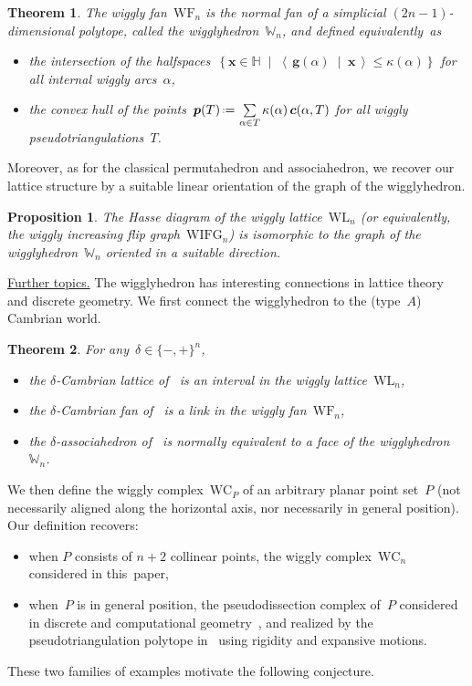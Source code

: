 \documentclass{amsart}
\newtheorem*{theorem*}{Theorem}%
\newtheorem*{proposition*}{Proposition}%
\theoremstyle{definition}
\newcommand{\HH}{\mathbb{H}} %
\renewcommand{\b}[1]{{\boldsymbol{#1}}} %
\newcommand{\set}[2]{\left\{ #1 \;\middle|\; #2 \right\}} %
\newcommand{\dotprod}[2]{\left\langle \, #1 \; \middle| \; #2 \, \right\rangle} %
\newcommand{\eqdef}{\mbox{\,\raisebox{0.2ex}{\scriptsize\ensuremath{\mathrm:}}\ensuremath{=}\,}} %
\newcommand{\darkblue}{\color{darkblue}} %
\newcommand{\defn}[1]{\textsl{\darkblue #1}} %
\newcommand{\para}[1]{\smallskip\noindent\uline{#1.}} %
\newcommand{\polytope}[1]{\mathds{#1}} %
\newcommand{\wigglyComplex}{\mathrm{WC}} %
\newcommand{\wigglyIncreasingFlipGraph}{\mathrm{WIFG}} %
\newcommand{\wigglyLattice}{\mathrm{WL}} %
\newcommand{\wigglyFan}{\mathrm{WF}} %
\newcommand{\wigglyhedron}{\polytope{W}} %
\begin{document}
\begin{theorem*}
The wiggly fan~$\wigglyFan_n$ is the normal fan of a simplicial $(2n-1)$-dimensional polytope, called the \defn{wigglyhedron}~$\wigglyhedron_n$, and defined equivalently~as
\begin{itemize}
\item the intersection of the halfspaces~$\set{\b{x} \in \HH}{\dotprod{\b{g}(\alpha)}{\b{x}} \le \kappa(\alpha)}$ for all internal wiggly arcs~$\alpha$,
\item the convex hull of the points~$\b{p}(T) \eqdef \sum\limits_{\alpha \in T} \kappa(\alpha) \, \b{c}(\alpha, T)$ for all wiggly pseudotriangulations~$T$.
\end{itemize}
\end{theorem*}

Moreover, as for the classical permutahedron and associahedron, we recover our lattice structure by a suitable linear orientation of the graph of the wigglyhedron.

\begin{proposition*}
The Hasse diagram of the wiggly lattice~$\wigglyLattice_n$ (or equivalently, the wiggly increasing flip graph~$\wigglyIncreasingFlipGraph_n$) is isomorphic to the graph of the wigglyhedron~$\wigglyhedron_n$ oriented in a suitable direction.
\end{proposition*}

\para{Further topics}
The wigglyhedron has interesting connections in lattice theory and discrete geometry.
We first connect the wigglyhedron to the (type~$A$) Cambrian world.

\begin{theorem*}
For any~$\delta \in \{-,+\}^n$,
\begin{itemize}
\item the $\delta$-Cambrian lattice of~\cite{Reading-CambrianLattices} is an interval in the wiggly lattice~$\wigglyLattice_n$,
\item the $\delta$-Cambrian fan of~\cite{ReadingSpeyer} is a link in the wiggly fan~$\wigglyFan_n$,
\item the $\delta$-associahedron of~\cite{HohlwegLange} is normally equivalent to a face of the wigglyhedron~$\wigglyhedron_n$.
\end{itemize}
\end{theorem*}

We then define the wiggly complex~$\wigglyComplex_P$ of an arbitrary planar point set~$P$ (not necessarily aligned along the horizontal axis, nor necessarily in general position).
Our definition recovers:
\begin{itemize}
\item when $P$ consists of $n+2$ collinear points, the wiggly complex~$\wigglyComplex_n$ considered in this~paper,
\item when~$P$ is in general position, the pseudodissection complex of~$P$ considered in discrete and computational geometry~\cite{PocchiolaVegter,RoteSantosStreinu-pseudotriangulations}, and realized by the pseudotriangulation polytope in~\cite{RoteSantosStreinu-polytope} using rigidity and expansive motions.
\end{itemize}
These two families of examples motivate the following conjecture.
\end{document}
